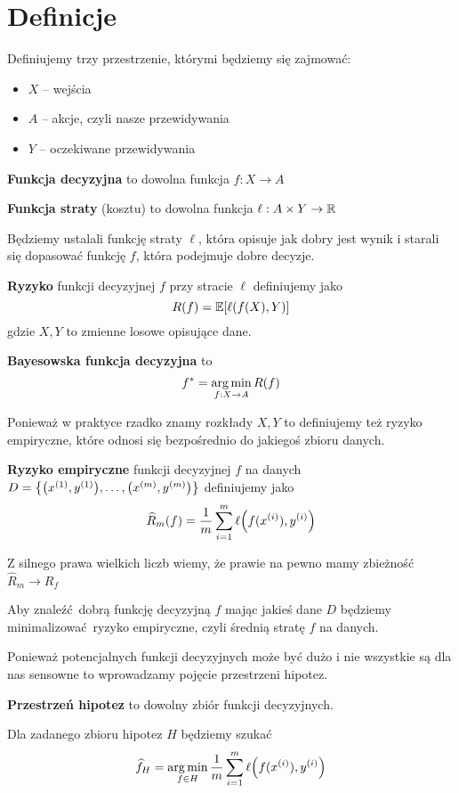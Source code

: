 \section{Definicje}

Definiujemy trzy przestrzenie, którymi będziemy się zajmować:
\begin{itemize}
    \item \( X \) -- wejścia
    \item \( A \) -- akcje, czyli nasze przewidywania
    \item \( Y \) -- oczekiwane przewidywania
\end{itemize}

\begin{definition}
\textbf{Funkcja decyzyjna} to dowolna funkcja \( f : X \rightarrow A \)
\end{definition}

\begin{definition}
\textbf{Funkcja straty} (kosztu) to dowolna funkcja \( \ell : A \times Y \rightarrow \mathbb{R} \)
\end{definition}

Będziemy ustalali funkcję straty \( \ell \), która opisuje jak dobry jest wynik i starali się dopasować funkcję \( f \), która podejmuje dobre decyzje.


\begin{definition}
\textbf{Ryzyko} funkcji decyzyjnej \( f \) przy stracie \( \ell \) definiujemy jako 
\[
    R(f) = \expected{\ell(f(X), Y)}
\]
gdzie \( X, Y \) to zmienne losowe opisujące dane.
\end{definition}

\begin{definition}
\textbf{Bayesowska funkcja decyzyjna} to
\[
    f^* = \operatorname*{arg\,min}_{f : X \rightarrow A} R(f)
\]
\end{definition}

Ponieważ w praktyce rzadko znamy rozkłady \( X, Y \) to definiujemy też ryzyko empiryczne, które odnosi się bezpośrednio do jakiegoś zbioru danych.

\begin{definition}
\textbf{Ryzyko empiryczne} funkcji decyzyjnej \( f \) na danych \( D = \set{ \pars{x^{(1)}, y^{(1)}}, \dots, \pars{x^{(m)}, y^{(m)}} }\) definiujemy jako
\[
    \widehat R_m(f) = \frac{1}{m} \sum_{i=1}^m \ell\pars{f(x^{(i)}), y^{(i)}}
\]
\end{definition}
Z silnego prawa wielkich liczb wiemy, że prawie na pewno mamy zbieżność \( \widehat R_m \rightarrow R_f \)

Aby znaleźć dobrą funkcję decyzyjną \( f \) mając jakieś dane \( D \) będziemy minimalizować ryzyko empiryczne, czyli średnią stratę \( f \) na danych.

Ponieważ potencjalnych funkcji decyzyjnych może być dużo i nie wszystkie są dla nas sensowne to wprowadzamy pojęcie przestrzeni hipotez.

\begin{definition}
\textbf{Przestrzeń hipotez} to dowolny zbiór funkcji decyzyjnych.
\end{definition}

Dla zadanego zbioru hipotez \( H \) będziemy szukać
\[
    \widehat f_H = \argmin_{f \in H} \frac{1}{m} \sum_{i=1}^m \ell\pars{f(x^{(i)}), y^{(i)}}
\]
